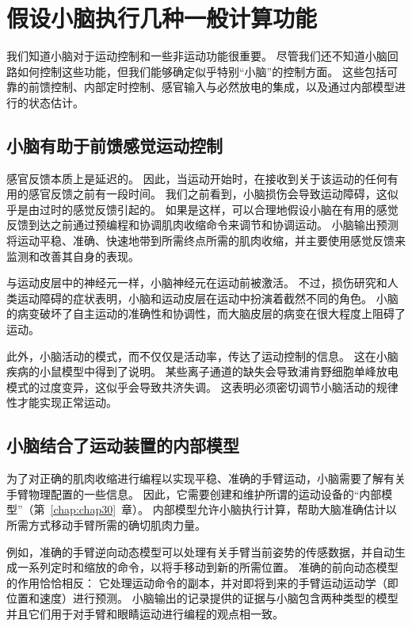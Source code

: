 \section{假设小脑执行几种一般计算功能}

我们知道小脑对于运动控制和一些非运动功能很重要。
尽管我们还不知道小脑回路如何控制这些功能，但我们能够确定似乎特别“小脑”的控制方面。
这些包括可靠的前馈控制、内部定时控制、感官输入与必然放电的集成，以及通过内部模型进行的状态估计。



\subsection{小脑有助于前馈感觉运动控制}

感官反馈本质上是延迟的。
因此，当运动开始时，在接收到关于该运动的任何有用的感官反馈之前有一段时间。
我们之前看到，小脑损伤会导致运动障碍，这似乎是由过时的感觉反馈引起的。
如果是这样，可以合理地假设小脑在有用的感觉反馈到达之前通过预编程和协调肌肉收缩命令来调节和协调运动。
小脑输出预测将运动平稳、准确、快速地带到所需终点所需的肌肉收缩，并主要使用感觉反馈来监测和改善其自身的表现。


与运动皮层中的神经元一样，小脑神经元在运动前被激活。
不过，损伤研究和人类运动障碍的症状表明，小脑和运动皮层在运动中扮演着截然不同的角色。
小脑的病变破坏了自主运动的准确性和协调性，而大脑皮层的病变在很大程度上阻碍了运动。


此外，小脑活动的模式，而不仅仅是活动率，传达了运动控制的信息。
这在小脑疾病的小鼠模型中得到了说明。
某些离子通道的缺失会导致浦肯野细胞单峰放电模式的过度变异，这似乎会导致共济失调。
这表明必须密切调节小脑活动的规律性才能实现正常运动。



\subsection{小脑结合了运动装置的内部模型}

为了对正确的肌肉收缩进行编程以实现平稳、准确的手臂运动，小脑需要了解有关手臂物理配置的一些信息。
因此，它需要创建和维护所谓的运动设备的“内部模型”（第~\ref{chap:chap30}~章）。
内部模型允许小脑执行计算，帮助大脑准确估计以所需方式移动手臂所需的确切肌肉力量。


例如，准确的手臂逆向动态模型可以处理有关手臂当前姿势的传感数据，并自动生成一系列定时和缩放的命令，以将手移动到新的所需位置。
准确的前向动态模型的作用恰恰相反：
它处理运动命令的副本，并对即将到来的手臂运动运动学（即位置和速度）进行预测。
小脑输出的记录提供的证据与小脑包含两种类型的模型并且它们用于对手臂和眼睛运动进行编程的观点相一致。


